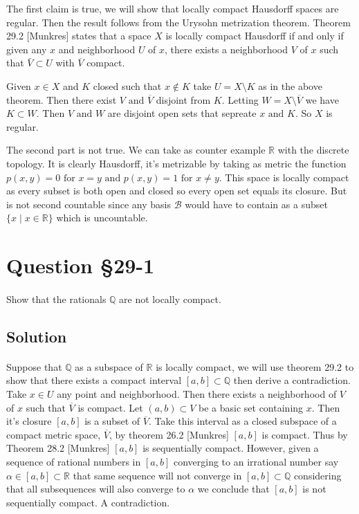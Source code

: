 \documentclass[11pt, oneside]{article}   	%
\newcommand{\R}{\mathbb{R}}
\newcommand{\Q}{\mathbb{Q}}
\newcommand{\scr}[1]{\mathscr{#1}}
\newcommand{\tand}{\text{ and }}
\newcommand{\tfor}{\text{ for }}
\newcommand{\st}{\mid}
\newcommand{\set}[1]{\{ #1 \}}
\begin{document}
The first claim is true, we will show that locally compact Hausdorff spaces are regular. Then the result follows from the Urysohn metrization theorem. Theorem 29.2 [Munkres] states that a space $X$ is locally compact Hausdorff if and only if given any $x$ and neighborhood $U$ of $x$, there exists a neighborhood $V$ of $x$ such that $\bar{V} \subset U$ with $\overline{V}$ compact.

Given $x \in X$ and $K$ closed such that $x \not \in K$ take $U = X \setminus K$ as in the above theorem. Then there exist $V \tand \overline{V}$ disjoint from $K$. Letting $W = X \setminus \overline{V}$ we have $K \subset W$. Then $V \tand W$ are disjoint open sets that sepreate $x \tand K$. So $X$ is regular.

The second part is not true. We can take as counter example $\R$ with the discrete topology. It is clearly Hausdorff, it's metrizable by taking as metric the function $p(x,y) = 0 \tfor x = y \tand p(x,y) = 1 \tfor x \neq y$. This space is locally compact as every subset is both open and closed so every open set equals its closure. But is not second countable since any basis $\scr{B}$ would have to contain as a subset $\set{x \st x \in \R}$ which is uncountable.


\section*{Question \S29-1}
\paragraph{}
 
 Show that the rationals $\Q$ are not locally compact.
 
 \subsection*{Solution}
 \paragraph{}
 
Suppose that $\Q$ as a subspace of $\R$ is locally compact, we will use theorem 29.2 to show that there exists a compact interval $[a,b] \subset \Q$ then derive a contradiction. Take $x \in U$ any point and neighborhood. Then there exists a neighborhood of $V$ of $x$ such that $\overline{V}$ is compact. Let $(a,b) \subset V$ be a basic set containing $x$. Then it's closure $[a,b]$ is a subset of $\overline{V}$. Take this interval as a closed subspace of a compact metric space, $\overline{V}$, by theorem 26.2 [Munkres] $[a,b]$ is compact. Thus by Theorem 28.2 [Munkres] $[a,b]$ is sequentially compact. However, given a sequence of rational numbers in $[a,b]$ converging to an irrational number say $\alpha \in [a,b] \subset \R$ that same sequence will not converge in $[a,b] \subset \Q$ considering that all subsequences will also converge to $\alpha$ we conclude that $[a,b]$ is not sequentially compact. A contradiction.
\end{document}
